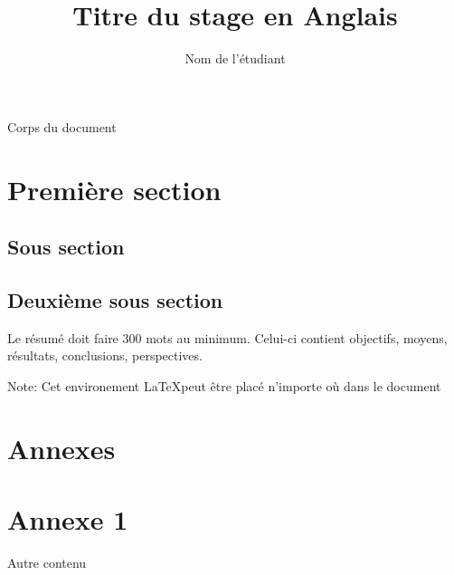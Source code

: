 \documentclass{rapportcpe}
\title{Titre du stage en Anglais}
\author{Nom de l'étudiant}
\begin{document}
	\tableofcontents %
	Corps du document
	\section{Première section}
	\subsection{Sous section}

\pagebreak
	\subsection{Deuxième sous section}

\begin{resumestage}
	Le résumé doit faire 300 mots au minimum. Celui-ci contient objectifs, moyens, résultats, conclusions, perspectives.

	Note: Cet environement \LaTeX peut être placé n'importe où dans le document
\end{resumestage}

\section{Annexes}
\appendix %

\section{Annexe 1}
Autre contenu
\end{document}
